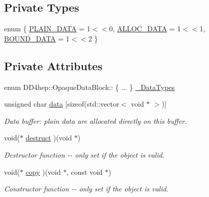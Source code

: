 \subsection*{Private Types}
\begin{DoxyCompactItemize}
\item 
enum \{ \hyperlink{class_d_d4hep_1_1_opaque_data_block_a6c653f7754960906a4a260f035e915bca9c3e9fc003a5148f3f1707780b347eeb}{PLAIN\_\-DATA} =  1$<$$<$0, 
\hyperlink{class_d_d4hep_1_1_opaque_data_block_a6c653f7754960906a4a260f035e915bca10ec45b910bc75641243cb866d304fa7}{ALLOC\_\-DATA} =  1$<$$<$1, 
\hyperlink{class_d_d4hep_1_1_opaque_data_block_a6c653f7754960906a4a260f035e915bcafca2143abe27ac43e936bf63f6771b9e}{BOUND\_\-DATA} =  1$<$$<$2
 \}
\end{DoxyCompactItemize}
\subsection*{Private Attributes}
\begin{DoxyCompactItemize}
\item 
enum DD4hep::OpaqueDataBlock:: \{ ... \}  \hyperlink{class_d_d4hep_1_1_opaque_data_block_a0e431bafd05dde4afeba30aab68e8930}{\_\-DataTypes}
\item 
unsigned char \hyperlink{class_d_d4hep_1_1_opaque_data_block_ab598893c35f36d91467423c37a28984e}{data} \mbox{[}sizeof(std::vector$<$ void $\ast$ $>$)\mbox{]}
\begin{DoxyCompactList}\small\item\em Data buffer: plain data are allocated directly on this buffer. \item\end{DoxyCompactList}\item 
void($\ast$ \hyperlink{class_d_d4hep_1_1_opaque_data_block_a6958d0e712c3e0126bc61b84d1f16ed2}{destruct} )(void $\ast$)
\begin{DoxyCompactList}\small\item\em Destructor function -\/-\/ only set if the object is valid. \item\end{DoxyCompactList}\item 
void($\ast$ \hyperlink{class_d_d4hep_1_1_opaque_data_block_a7da11d357cbefd4d6cf56390d321f69e}{copy} )(void $\ast$, const void $\ast$)
\begin{DoxyCompactList}\small\item\em Constructor function -\/-\/ only set if the object is valid. \item\end{DoxyCompactList}\end{DoxyCompactItemize}


